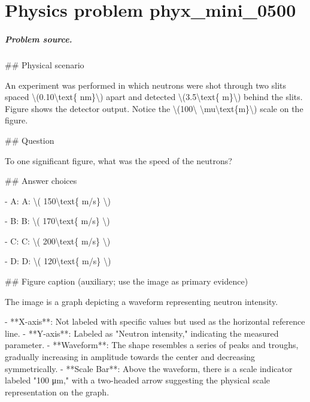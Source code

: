 
\chapter{Physics problem phyx\_mini\_0500}
\label{ch:PhyXMiniProblems_problem_phyx_mini_0500}

\paragraph{Problem source.}
\#\# Physical scenario

An experiment was performed in which neutrons were shot through two slits spaced \textbackslash{}(0.10\textbackslash{}text\{ nm\}\textbackslash{}) apart and detected \textbackslash{}(3.5\textbackslash{}text\{ m\}\textbackslash{}) behind the slits. Figure shows the detector output. Notice the \textbackslash{}(100\textbackslash{} \textbackslash{}mu\textbackslash{}text\{m\}\textbackslash{}) scale on the figure.

\#\# Question

To one significant figure, what was the speed of the neutrons?

\#\# Answer choices

- A: A: \textbackslash{}( 150\textbackslash{}text\{ m/s\} \textbackslash{})

- B: B: \textbackslash{}( 170\textbackslash{}text\{ m/s\} \textbackslash{})

- C: C: \textbackslash{}( 200\textbackslash{}text\{ m/s\} \textbackslash{})

- D: D: \textbackslash{}( 120\textbackslash{}text\{ m/s\} \textbackslash{})

\#\# Figure caption (auxiliary; use the image as primary evidence)

The image is a graph depicting a waveform representing neutron intensity. 

- **X-axis**: Not labeled with specific values but used as the horizontal reference line.
- **Y-axis**: Labeled as "Neutron intensity," indicating the measured parameter.
- **Waveform**: The shape resembles a series of peaks and troughs, gradually increasing in amplitude towards the center and decreasing symmetrically.
- **Scale Bar**: Above the waveform, there is a scale indicator labeled "100 μm," with a two-headed arrow suggesting the physical scale representation on the graph.

